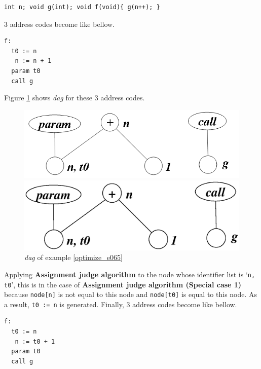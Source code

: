 \begin{Example}
\label{optimize_e065}
\begin{verbatim}
int n; void g(int); void f(void){ g(n++); }
\end{verbatim}
3 address codes become like bellow.
\begin{verbatim}
f:
  t0 := n
   n := n + 1
  param t0
  call g
\end{verbatim}
Figure \ref{optimize_e066} shows {\em dag} for these 3 address codes.
\begin{figure}[htbp]
\begin{center}
\begin{htmlonly}
\includegraphics[width=1.0\linewidth,height=0.328\linewidth]{opt027.png}
\end{htmlonly}
\begin{latexonly}
\includegraphics[width=1.0\linewidth,height=0.328\linewidth]{opt027.eps}
\end{latexonly}
\caption{{\em dag} of example \ref{optimize_e065}}
\label{optimize_e066}
\end{center}
\end{figure}
Applying {\bf Assignment judge
 algorithm} to the node whose identifier list is `{\tt{n, t0}}',
this is in the case
of {\bf Assignment judge algorithm (Special case 1)}
because {\tt{node[n]}} is not equal to this node and
{\tt{node[t0]}} is equal to this node.
As a result, {\tt{t0 := n}} is generated.
Finally, 3 address codes become like bellow.
\begin{verbatim}
f:
  t0 := n
   n := t0 + 1
  param t0
  call g
\end{verbatim}
\end{Example}

